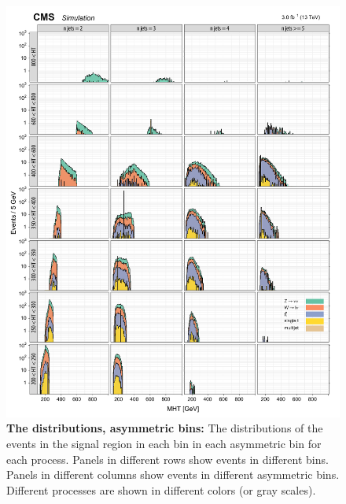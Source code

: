 \begin{figure}[!h]
\centering
\includegraphics[scale=0.95]{figures/kiplots/c150107_s150318_f015_MHT_40}
\caption{\textbf{\boldmath The \mht distributions, asymmetric \njet
bins:} The \mht distributions of the events in the signal region in each
\scalht bin in each asymmetric \njet bin for each process. Panels in
different rows show events in different \scalht bins. Panels in
different columns show events in different asymmetric \njet bins.
Different processes are shown in different colors (or gray scales).}
\label{c150107_s150318_f015_MHT_40}
\end{figure}

